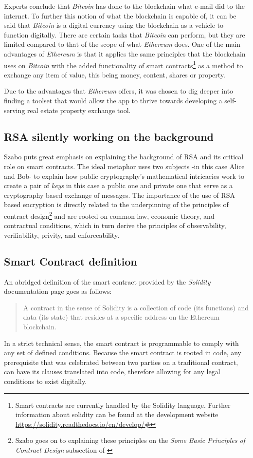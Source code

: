 \documentclass[submission,copyright,creativecommons]{eptcs}
\begin{document}
Experts conclude that \textit{Bitcoin} has done to the blockchain what e-mail did to the internet.  To further this notion of what the blockchain is capable of, it can be said that \textit{Bitcoin} is a digital currency using the blockchain as a vehicle to function digitally.  There are certain tasks that \textit{Bitcoin} can perform, but they are limited compared to that of the scope of what \textit{Ethereum} does.  One of the main advantages of \textit{Ethereum} is that it applies the same principles that the blockchain uses on \textit{Bitcoin} with the added functionality of smart contracts\footnote{Smart contracts are currently handled by the Solidity language.  Further information about solidity can be found at the development website \url{https://solidity.readthedocs.io/en/develop/#}\cite{SoliditySolidity23}} as a method to exchange any item of value, this being money, content, shares or property.

Due to the advantages that \textit{Ethereum} offers, it was chosen to dig deeper into finding a toolset that would allow the app to thrive towards developing a self-serving real estate property exchange tool.

\subsection{RSA silently working on the background}
Szabo puts great emphasis on explaining the background of RSA\cite{milanov2009rsa} and its critical role on smart contracts.  The ideal metaphor uses two subjects -in this case Alice and Bob- to explain how public cryptography's mathematical intricacies work to create a pair of \textit{keys} in this case a public one and private one that serve as a cryptography based exchange of messages.  The importance of the use of RSA based encryption is directly related to the underpinning of the principles of contract design\footnote{Szabo goes on to explaining these principles on the \textit{Some Basic Principles of Contract Design} subsection of \cite{NickSzaboSmart}} and are rooted on common law, economic theory, and contractual conditions, which in turn derive the principles of observability, verifiability, privity, and enforceability.

\subsection{Smart Contract definition}
An abridged definition of the smart contract provided by the \textit{Solidity} documentation page goes as follows:
\begin{quote}
    A contract in the sense of Solidity is a collection of code (its functions) and data (its state) that resides at a specific address on the Ethereum blockchain.\cite{IntroductionSmartContracts}
\end{quote}
In a strict technical sense, the smart contract is programmable to comply with any set of defined conditions.  Because the smart contract is rooted in code, any prerequisite that was celebrated between two parties on a traditional contract, can have its clauses translated into code, therefore allowing for any legal conditions to exist digitally.
\end{document}
